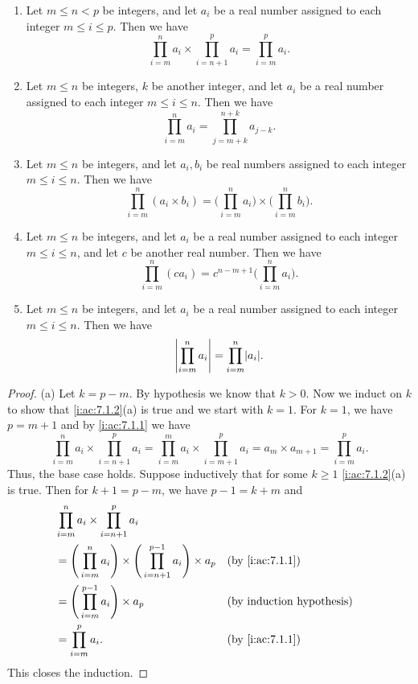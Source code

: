 \begin{ac}\label{i:ac:7.1.2}
  \begin{enumerate}
    \item Let \(m \leq n < p\) be integers, and let \(a_i\) be a real number assigned to each integer \(m \leq i \leq p\).
          Then we have
          \[
            \prod_{i = m}^n a_i \times \prod_{i = n + 1}^p a_i = \prod_{i = m}^p a_i.
          \]
    \item Let \(m \leq n\) be integers, \(k\) be another integer, and let \(a_i\) be a real number assigned to each integer \(m \leq i \leq n\).
          Then we have
          \[
            \prod_{i = m}^n a_i = \prod_{j = m + k}^{n + k} a_{j - k}.
          \]
    \item Let \(m \leq n\) be integers, and let \(a_i, b_i\) be real numbers assigned to each integer \(m \leq i \leq n\).
          Then we have
          \[
            \prod_{i = m}^n (a_i \times b_i) = \Bigg(\prod_{i = m}^n a_i\Bigg) \times \Bigg(\prod_{i = m}^n b_i\Bigg).
          \]
    \item Let \(m \leq n\) be integers, and let \(a_i\) be a real number assigned to each integer \(m \leq i \leq n\), and let \(c\) be another real number.
          Then we have
          \[
            \prod_{i = m}^n (ca_i) = c^{n - m + 1} \Bigg(\prod_{i = m}^n a_i\Bigg).
          \]
    \item Let \(m \leq n\) be integers, and let \(a_i\) be a real number assigned to each integer \(m \leq i \leq n\).
          Then we have
          \[
            \abs{\prod_{i = m}^n a_i} = \prod_{i = m}^n \abs{a_i}.
          \]
  \end{enumerate}
\end{ac}

\begin{proof}{(a)}
  Let \(k = p - m\).
  By hypothesis we know that \(k > 0\).
  Now we induct on \(k\) to show that \cref{i:ac:7.1.2}(a) is true and we start with \(k = 1\).
  For \(k = 1\), we have \(p = m + 1\) and by \cref{i:ac:7.1.1} we have
  \[
    \prod_{i = m}^n a_i \times \prod_{i = n + 1}^p a_i = \prod_{i = m}^m a_i \times \prod_{i = m + 1}^p a_i = a_m \times a_{m + 1} = \prod_{i = m}^p a_i.
  \]
  Thus, the base case holds.
  Suppose inductively that for some \(k \geq 1\) \cref{i:ac:7.1.2}(a) is true.
  Then for \(k + 1 = p - m\), we have \(p - 1 = k + m\) and
  \begin{align*}
     & \prod_{i = m}^n a_i \times \prod_{i = n + 1}^p a_i                                                                 \\
     & = \Bigg(\prod_{i = m}^n a_i\Bigg) \times \Bigg(\prod_{i = n + 1}^{p - 1} a_i\Bigg) \times a_p &  & \by{i:ac:7.1.1} \\
     & = \Bigg(\prod_{i = m}^{p - 1} a_i\Bigg) \times a_p                                            &  & \byIH           \\
     & = \prod_{i = m}^p a_i.                                                                        &  & \by{i:ac:7.1.1}
  \end{align*}
  This closes the induction.
\end{proof}

